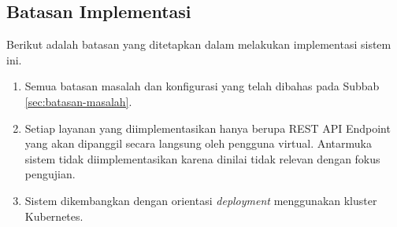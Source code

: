 \subsection{Batasan Implementasi}

Berikut adalah batasan yang ditetapkan dalam melakukan implementasi sistem ini.

\begin{enumerate}
  \item Semua batasan masalah dan konfigurasi yang telah dibahas pada Subbab \ref{sec:batasan-masalah}.
  \item Setiap layanan yang diimplementasikan hanya berupa REST API Endpoint yang akan dipanggil secara langsung oleh pengguna virtual. Antarmuka sistem tidak diimplementasikan karena dinilai tidak relevan dengan fokus pengujian.
  \item Sistem dikembangkan dengan orientasi \textit{deployment} menggunakan kluster Kubernetes.
\end{enumerate}
